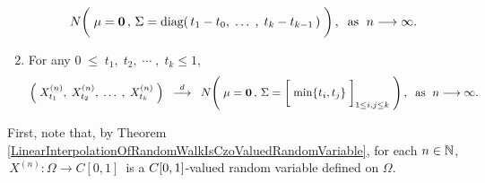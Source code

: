 \begin{theorem}
\begin{enumerate}
\begin{equation*}
		N\!\left(\;
		\mathbf{\mu} = \mathbf{0}\,,\,
		\overset{{\color{white}1}}{\Sigma} = \diag\!\left(\,t_{1}-t_{0},\; \ldots\; ,\; t_{k}-t_{k-1}\,\right)
		\;\right),
		\;\;
		\textnormal{as \;$n \longrightarrow \infty$}.
		\end{equation*}
\item	For any \;$0 \;\leq\; t_{1},\; t_{2}, \;\cdots\;,\; t_{k} \leq 1$,
		\begin{equation*}
		\left(\;X^{(n)}_{t_{1}},\; X^{(n)}_{t_{2}}, \;\ldots\;,\; X^{(n)}_{t_{k}}\;\right)
		\;\; \overset{d}{\longrightarrow} \;\;
		N\!\left(\;
		\mathbf{\mu} = \mathbf{0}\,,\,
		\Sigma = \left[\;\min\{\overset{{\color{white}1}}{t}_{i},t_{j}\}\;\right]_{1\leq i,j\leq k}
		\;\right),
		\;\;\textnormal{as \;$n \longrightarrow \infty$}.
		\end{equation*}
\end{enumerate}
\end{theorem}
\proof
First, note that, by
Theorem \ref{LinearInterpolationOfRandomWalkIsCzoValuedRandomVariable},
for each $n \in \mathbb{N}$,
\,$X^{(n)} : \Omega \longrightarrow C[0,1]$\,
is a $C[0,1]$-valued random variable defined on $\Omega$.
